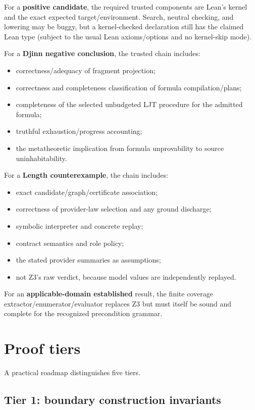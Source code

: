 \documentclass[10pt,letterpaper,oneside]{report}
\newcommand{\term}[1]{\textbf{#1}}
\begin{document}
For a \term{positive candidate}, the required trusted components are Lean's kernel and the exact expected target/environment. Search, neutral checking, and lowering may be buggy, but a kernel-checked declaration still has the claimed Lean type (subject to the usual Lean axioms/options and no kernel-skip mode).

For a \term{Djinn negative conclusion}, the trusted chain includes:

\begin{itemize}
  \item correctness/adequacy of fragment projection;
  \item correctness and completeness classification of formula compilation/plans;
  \item completeness of the selected unbudgeted LJT procedure for the admitted formula;
  \item truthful exhaustion/progress accounting;
  \item the metatheoretic implication from formula unprovability to source uninhabitability.
\end{itemize}

For a \term{Length counterexample}, the chain includes:

\begin{itemize}
  \item exact candidate/graph/certificate association;
  \item correctness of provider-law selection and any ground discharge;
  \item symbolic interpreter and concrete replay;
  \item contract semantics and role policy;
  \item the stated provider summaries as assumptions;
  \item not Z3's raw verdict, because model values are independently replayed.
\end{itemize}

For an \term{applicable-domain established} result, the finite coverage extractor/enumerator/evaluator replaces Z3 but must itself be sound and complete for the recognized precondition grammar.

\section{Proof tiers}

A practical roadmap distinguishes five tiers.

\subsection{Tier 1: boundary construction invariants}
\end{document}
